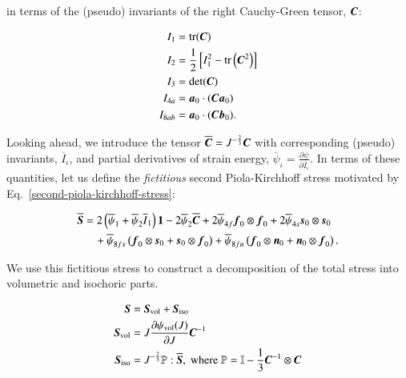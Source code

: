 \noindent in terms of the (pseudo) invariants of the right
Cauchy-Green tensor, $\mbox{\boldmath$ C$}$:

\begin{equation}
  \begin{split}
    I_{1} &= \mathrm{tr}(\mbox{\boldmath$ C$})\\
    I_{2} &= \frac{1}{2}\left[I_{1}^{2} - \mathrm{tr}\left(\mbox{\boldmath$ C$}^{2}\right)\right]\\
    I_{3} &= \mathrm{det}(\mbox{\boldmath$ C$})\\
    I_{4a} &= \mbox{\boldmath$ a$}_{0}\cdot(\mbox{\boldmath$ C$}\mbox{\boldmath$ a$}_{0})\\
    I_{8ab} &= \mbox{\boldmath$ a$}_{0}\cdot(\mbox{\boldmath$ C$}\mbox{\boldmath$ b$}_{0}).
  \end{split}
\end{equation}

Looking ahead, we introduce the tensor $\overline{\mbox{\boldmath$ C$}} =
J^{-\frac{2}{3}} \mbox{\boldmath$ C$}$ with corresponding (pseudo) invariants,
$\overline{I}_{\iota}$, and partial derivatives of strain energy,
$\overline{\psi}_{\iota} = \frac{\partial \psi}{\partial
  \overline{I}_{\iota}}$. In terms of these quantities, let us define
the {\em fictitious} second Piola-Kirchhoff stress motivated by
Eq.~\ref{second-piola-kirchhoff-stress}:

\begin{equation}
  \begin{split}
    \overline{\mbox{\boldmath$ S$}} &= 2 \left(\overline{\psi}_{1} + \overline{\psi}_{2} \overline{I}_{1} \right) {\bf 1}
                    - 2 \overline{\psi}_{2} \overline{\mbox{\boldmath$ C$}}
                    + 2 \overline{\psi}_{4f} \mbox{\boldmath$ f$}_{0}\otimes\mbox{\boldmath$ f$}_{0}
                    + 2 \overline{\psi}_{4s} \mbox{\boldmath$ s$}_{0}\otimes\mbox{\boldmath$ s$}_{0}\\
            &\quad  + \overline{\psi}_{8fs} \left( \mbox{\boldmath$ f$}_{0}\otimes\mbox{\boldmath$ s$}_{0} + \mbox{\boldmath$ s$}_{0}\otimes\mbox{\boldmath$ f$}_{0} \right)
                    + \overline{\psi}_{8fn} \left( \mbox{\boldmath$ f$}_{0}\otimes\mbox{\boldmath$ n$}_{0} + \mbox{\boldmath$ n$}_{0}\otimes\mbox{\boldmath$ f$}_{0} \right).
  \end{split}
\end{equation}

\noindent We use this fictitious stress to construct a decomposition
of the total stress into volumetric and isochoric parts.

\begin{equation}
  \begin{split}
    \mbox{\boldmath$ S$} &= \mbox{\boldmath$ S$}_{\mathrm{vol}} + \mbox{\boldmath$ S$}_{\mathrm{iso}}\\
    \mbox{\boldmath$ S$}_{\mathrm{vol}} &= J \frac{\partial \psi_{\mathrm{vol}}(J)}{\partial J} \mbox{\boldmath$ C$}^{-1}\\
    \mbox{\boldmath$ S$}_{\mathrm{iso}} &= J^{-\frac{2}{3}} \mathbb{P}:\overline{\mbox{\boldmath$ S$}},\; \mathrm{where}\; \mathbb{P} = \mathbb{I} - \frac{1}{3} \mbox{\boldmath$ C$}^{-1}\otimes\mbox{\boldmath$ C$}
  \end{split}
\end{equation}



